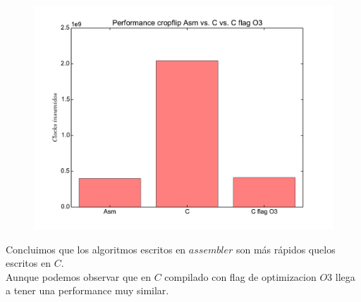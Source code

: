 \newpage

\begin{figure}
  \begin{center}
	\includegraphics[scale=0.5]{cropflip.pdf}
  \end{center}
\end{figure}

Concluimos que los algoritmos escritos en $assembler$ son más rápidos quelos escritos en $C$. \\
Aunque podemos observar que en $C$ compilado con flag de optimizacion $O3$ llega a tener una performance muy similar.  \\

\newpage
